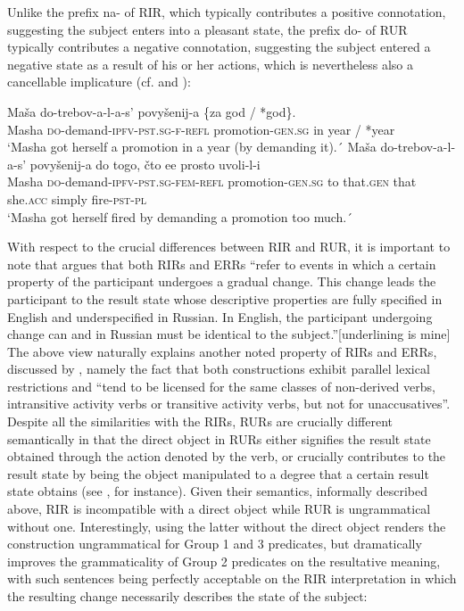 \documentclass[output=paper,colorlinks,citecolor=brown,modfonts,nonflat]{langsci/langscibook}
\begin{document}
Unlike the prefix {na}{}- of RIR, which typically contributes a positive connotation, suggesting the subject enters into a pleasant state, the prefix {do{}-} of RUR typically contributes a negative connotation, suggesting the subject entered a negative state as a result of his or her actions, which is nevertheless also a cancellable implicature (cf.  and ):


\ea%
    \label{ex:antonyuk:43}
    \ea \label{ex:antonyuk:43a}
    \gll    Maša do-trebov-a-l-a-s’ povyšenij-a \{za god / *god\}.\\
            Masha \textsc{do-}demand\textsc{-ipfv-pst.sg-f-refl} promotion\textsc{-gen.sg} in year / *year\\
    \glt    `Masha got herself a promotion in a year (by demanding it).´
    \ex \label{ex:antonyuk:43b}
    \gll    Maša do-trebov-a-l-a-s’ povyšenij-a	do togo, čto ee prosto uvoli-l-i\\
            Masha \textsc{do-}demand\textsc{-ipfv-pst.sg-fem-refl} promotion\textsc{-gen.sg} to that\textsc{.gen} that she\textsc{.acc} simply fire\textsc{-pst-pl}\\
    \glt    `Masha got herself fired by demanding a promotion too much.´
    \z
\z

With respect to the crucial differences between RIR and RUR, it is important to note that \citet{Tatevosov2010} argues that both RIRs and ERRs “refer to events in which a certain property of the participant undergoes a gradual change. This change leads the participant to the result state whose descriptive properties are fully specified in English and underspecified in Russian. In English, the participant undergoing change can and in Russian must be identical to the subject.”[underlining is mine] The above view naturally explains another noted property of RIRs and ERRs, discussed by \citeauthor{Tatevosov2010}, namely the fact that both constructions exhibit parallel lexical restrictions and “tend to be licensed for the same classes of non-derived verbs, intransitive activity verbs or transitive activity verbs, but not for unaccusatives”. Despite all the similarities with the RIRs, RURs are crucially different semantically in that the direct object in RURs either signifies the result state obtained through the action denoted by the verb, or crucially contributes to the result state by being the object manipulated to a degree that a certain result state obtains (see , for instance). Given their semantics, informally described above, RIR is incompatible with a direct object while RUR is ungrammatical without one. Interestingly, using the latter without the direct object renders the construction ungrammatical for Group 1 and 3 predicates, but dramatically improves the grammaticality of Group 2 predicates on the resultative meaning, with such sentences being perfectly acceptable on the RIR interpretation in which the resulting change necessarily describes the state of the subject:
\end{document}
